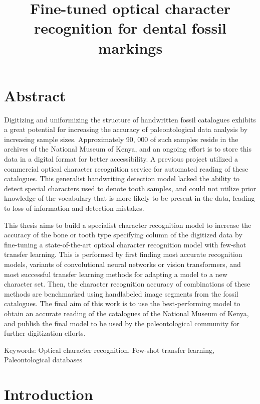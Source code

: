 \documentclass{article}
\title{Fine-tuned optical character recognition for dental fossil markings}
\begin{document}
\tableofcontents

\section{Abstract}

Digitizing and uniformizing the structure of handwritten fossil catalogues exhibits a great 
potential for increasing the accuracy of paleontological data analysis by increasing sample sizes. 
Approximately 90, 000 of such samples reside in the archives of the National Museum of Kenya, and 
an ongoing effort is to store this data in a digital format for better accessibility.
A previous project utilized a commercial optical character recognition service for automated reading of these catalogues. This generalist
handwriting detection model lacked the ability to detect special characters used to denote tooth samples, and could not utilize prior knowledge 
of the vocabulary that is more likely to be present in the data, leading to loss of information and detection mistakes.

This thesis aims to build a specialist character recognition model to increase the accuracy of 
the bone or tooth type specifying column of the digitized data by fine-tuning a state-of-the-art optical 
character recognition model with few-shot transfer learning. This is performed by first finding most accurate
recognition models, variants of convolutional neural networks or vision transformers, and most successful 
transfer learning methods for adapting a model to a new character set. Then, the character 
recognition accuracy of combinations of these methods are benchmarked using handlabeled image segments from the 
fossil catalogues. The final aim of this work is to use the best-performing model 
to obtain an accurate reading of the catalogues of the National Museum of Kenya, and publish the final model to be used 
by the paleontological community for further digitization efforts.

Keywords: Optical character recognition, Few-shot transfer learning, Paleontological databases

\section{Introduction}



\end{document}
